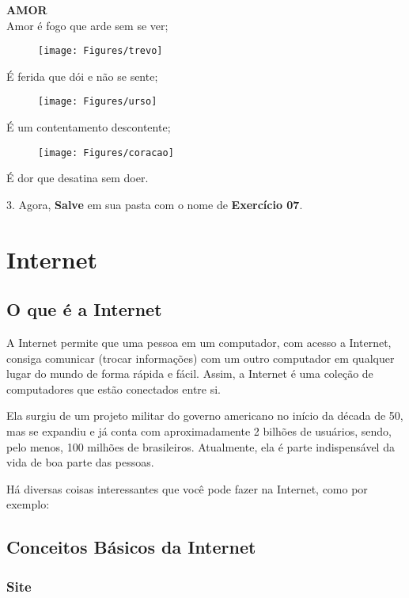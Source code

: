 \documentclass[hidelinks,12pt]{article}
\begin{document}
{\centering \textbf{AMOR}\\

Amor é fogo que arde sem se ver;
\begin{figure}[!h]
	\centering
	\texttt{[image: Figures/trevo]}
\end{figure}

É ferida que dói e não se sente;
\begin{figure}[!h]
	\centering
	\texttt{[image: Figures/urso]}
\end{figure}

É um contentamento descontente;

\begin{figure}[!h]
	\centering
	\texttt{[image: Figures/coracao]}
\end{figure}
É dor que desatina sem doer.

}
\bigskip

3. Agora, \textbf{Salve} em sua pasta com o nome de \textbf{Exercício 07}.

\section{Internet}

\subsection{O que é a Internet}

A Internet permite que uma pessoa em um computador, com acesso a Internet, consiga comunicar (trocar informações) com um outro computador em qualquer lugar do mundo de forma rápida e fácil. Assim, a Internet é uma coleção de computadores que estão conectados entre si.

Ela surgiu de um projeto militar do governo americano no início da década de 50, mas se expandiu e já conta com aproximadamente 2 bilhões de usuários, sendo, pelo menos, 100 milhões de brasileiros. Atualmente, ela é parte indispensável da vida de boa parte das pessoas.

Há diversas coisas interessantes que você pode fazer na Internet, como por exemplo:



\subsection{Conceitos Básicos da Internet}


\subsubsection{Site}
\end{document}
